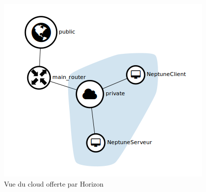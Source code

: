 \documentclass{report}
\begin{document}
    \begin{figure}[!ht]
        \centering{}\includegraphics[width=\textwidth]{network-topo.png}
        \caption{Vue du cloud offerte par Horizon} 
        \label{cloudHorizon}
    \end{figure}
\end{document}
